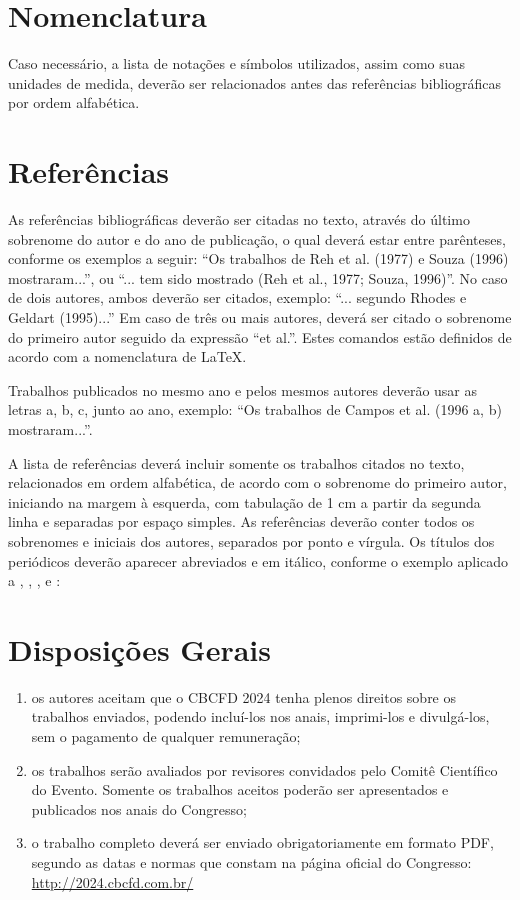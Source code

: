\documentclass[a4paper,12pt]{article}
\begin{document}
\section{Nomenclatura}
Caso necessário, a lista de notações e símbolos utilizados, assim como
suas unidades de medida, deverão ser relacionados antes das referências
bibliográficas por ordem alfabética.

\section{Referências}
As referências bibliográficas deverão ser citadas no texto, através do
último sobrenome do autor e do ano de publicação, o qual deverá estar
entre parênteses, conforme os exemplos a seguir: ``Os trabalhos de Reh
et al. (1977) e Souza (1996) mostraram...'', ou ``... tem sido mostrado
(Reh et al., 1977; Souza, 1996)''. No caso de dois autores, ambos
deverão ser citados, exemplo: ``... segundo Rhodes e Geldart (1995)...''
Em caso de três ou mais autores, deverá ser citado o sobrenome 
do primeiro autor seguido da expressão ``et al.''. Estes comandos estão
definidos de acordo com a nomenclatura de \LaTeX.

Trabalhos publicados no mesmo ano e pelos mesmos autores deverão usar
as letras a, b, c, junto ao ano, exemplo: ``Os trabalhos de Campos et
al. (1996 a, b) mostraram...''.

A lista de referências deverá incluir somente os trabalhos citados no
texto, relacionados em ordem alfabética, de acordo com o sobrenome do
primeiro autor, iniciando na margem à esquerda, com tabulação de 1 cm
a partir da segunda linha e separadas por espaço simples. As
referências deverão conter todos os sobrenomes e iniciais dos autores,
separados por ponto e vírgula. Os títulos dos periódicos deverão
aparecer abreviados e em itálico, conforme o exemplo aplicado a
\cite{Souza}, \citep{Rehetal77}, \citep{Silvaetal08a,DeitelDeitel}, 
\cite{Damian07} e \citep{Ribeiro05}:



\section{Disposições Gerais}
\begin{enumerate}
 \item[a.] os autores aceitam que o CBCFD 2024 tenha plenos direitos
           sobre os trabalhos enviados, podendo incluí-los nos anais,
           imprimi-los e divulgá-los, sem o pagamento de qualquer
           remuneração;
           
 \item[b.] os trabalhos serão avaliados por revisores convidados pelo
           Comitê Científico do Evento. Somente os trabalhos aceitos
           poderão ser apresentados e publicados nos anais do Congresso;

 \item[c.] o trabalho completo deverá ser enviado obrigatoriamente em
           formato PDF, segundo as datas e normas que constam na página
           oficial do Congresso:
           \url{http://2024.cbcfd.com.br/}
\end{enumerate}
\end{document}
